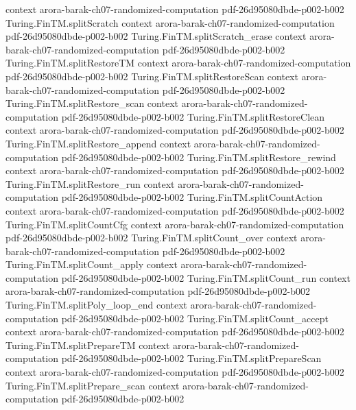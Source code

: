\begin{theorem}
  {context}
  {arora-barak-ch07-randomized-computation}
  {pdf-26d95080dbde-p002-b002}
\proofstep
  {Turing.FinTM.splitScratch}
  {context}
  {arora-barak-ch07-randomized-computation}
  {pdf-26d95080dbde-p002-b002}
\proofstep
  {Turing.FinTM.splitScratch_erase}
  {context}
  {arora-barak-ch07-randomized-computation}
  {pdf-26d95080dbde-p002-b002}
\proofstep
  {Turing.FinTM.splitRestoreTM}
  {context}
  {arora-barak-ch07-randomized-computation}
  {pdf-26d95080dbde-p002-b002}
\proofstep
  {Turing.FinTM.splitRestoreScan}
  {context}
  {arora-barak-ch07-randomized-computation}
  {pdf-26d95080dbde-p002-b002}
\proofstep
  {Turing.FinTM.splitRestore_scan}
  {context}
  {arora-barak-ch07-randomized-computation}
  {pdf-26d95080dbde-p002-b002}
\proofstep
  {Turing.FinTM.splitRestoreClean}
  {context}
  {arora-barak-ch07-randomized-computation}
  {pdf-26d95080dbde-p002-b002}
\proofstep
  {Turing.FinTM.splitRestore_append}
  {context}
  {arora-barak-ch07-randomized-computation}
  {pdf-26d95080dbde-p002-b002}
\proofstep
  {Turing.FinTM.splitRestore_rewind}
  {context}
  {arora-barak-ch07-randomized-computation}
  {pdf-26d95080dbde-p002-b002}
\proofstep
  {Turing.FinTM.splitRestore_run}
  {context}
  {arora-barak-ch07-randomized-computation}
  {pdf-26d95080dbde-p002-b002}
\proofstep
  {Turing.FinTM.splitCountAction}
  {context}
  {arora-barak-ch07-randomized-computation}
  {pdf-26d95080dbde-p002-b002}
\proofstep
  {Turing.FinTM.splitCountCfg}
  {context}
  {arora-barak-ch07-randomized-computation}
  {pdf-26d95080dbde-p002-b002}
\proofstep
  {Turing.FinTM.splitCount_over}
  {context}
  {arora-barak-ch07-randomized-computation}
  {pdf-26d95080dbde-p002-b002}
\proofstep
  {Turing.FinTM.splitCount_apply}
  {context}
  {arora-barak-ch07-randomized-computation}
  {pdf-26d95080dbde-p002-b002}
\proofstep
  {Turing.FinTM.splitCount_run}
  {context}
  {arora-barak-ch07-randomized-computation}
  {pdf-26d95080dbde-p002-b002}
\proofstep
  {Turing.FinTM.splitPoly_loop_end}
  {context}
  {arora-barak-ch07-randomized-computation}
  {pdf-26d95080dbde-p002-b002}
\proofstep
  {Turing.FinTM.splitCount_accept}
  {context}
  {arora-barak-ch07-randomized-computation}
  {pdf-26d95080dbde-p002-b002}
\proofstep
  {Turing.FinTM.splitPrepareTM}
  {context}
  {arora-barak-ch07-randomized-computation}
  {pdf-26d95080dbde-p002-b002}
\proofstep
  {Turing.FinTM.splitPrepareScan}
  {context}
  {arora-barak-ch07-randomized-computation}
  {pdf-26d95080dbde-p002-b002}
\proofstep
  {Turing.FinTM.splitPrepare_scan}
  {context}
  {arora-barak-ch07-randomized-computation}
  {pdf-26d95080dbde-p002-b002}
\proofstep

\end{theorem}
